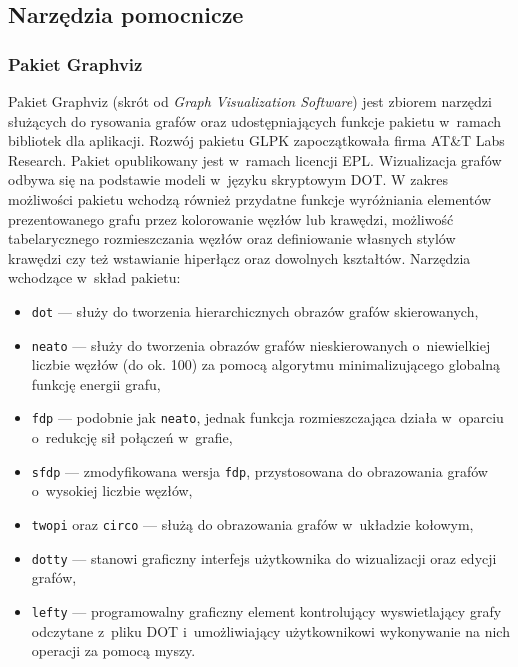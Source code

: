 \subsection{Narzędzia pomocnicze}\label{ss_internals_misc}
\subsubsection{\textbf{Pakiet Graphviz}}
\label{sss_internals_misc_graphviz}
\par{
  Pakiet Graphviz (skrót od \emph{Graph Visualization Software}) jest zbiorem narzędzi służących do rysowania grafów oraz udostępniających funkcje pakietu w~ramach bibliotek dla aplikacji.
  Rozwój pakietu GLPK zapoczątkowała firma AT\&T Labs Research.
  Pakiet opublikowany jest w~ramach licencji EPL.
  Wizualizacja grafów odbywa się na podstawie modeli w~języku skryptowym DOT.
  W zakres możliwości pakietu wchodzą również przydatne funkcje wyróżniania elementów prezentowanego grafu przez kolorowanie węzłów lub krawędzi, możliwość tabelarycznego rozmieszczania węzłów oraz definiowanie własnych stylów krawędzi czy też wstawianie hiperłącz oraz dowolnych kształtów.
  Narzędzia wchodzące w~skład pakietu:
  \begin{itemize}
    \item \texttt{dot} --- służy do tworzenia hierarchicznych obrazów grafów skierowanych,
    \item \texttt{neato} --- służy do tworzenia obrazów grafów nieskierowanych o~niewielkiej liczbie węzłów (do ok. 100) za pomocą algorytmu minimalizującego globalną funkcję energii grafu,
    \item \texttt{fdp} --- podobnie jak \texttt{neato}, jednak funkcja rozmieszczająca działa w~oparciu o~redukcję sił połączeń w~grafie,
    \item \texttt{sfdp} --- zmodyfikowana wersja \texttt{fdp}, przystosowana do obrazowania grafów o~wysokiej liczbie węzłów,
    \item \texttt{twopi} oraz \texttt{circo} --- służą do obrazowania grafów w~układzie kołowym,
    \item \texttt{dotty} --- stanowi graficzny interfejs użytkownika do wizualizacji oraz edycji grafów,
    \item \texttt{lefty} --- programowalny graficzny element kontrolujący wyswietlający grafy odczytane z~pliku DOT i~umożliwiający użytkownikowi wykonywanie na nich operacji za pomocą myszy.
  \end{itemize}
}
